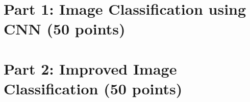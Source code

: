 \documentclass[
  coursecode={CMPE 351},
  assignmentname={Assignment 2},
  studentnumber=20053722,
  name={Bryan Hoang (16bch1)},
  draft,
  final,
  date=2020-03-07,
]{
  ltxanswer%
}
\begin{document}
  \section{Part 1: Image Classification using CNN (50 points)}

  \section{Part 2: Improved Image Classification (50 points)}
\end{document}
